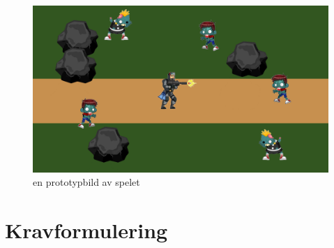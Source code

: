 \documentclass{TDP005mall}
\begin{document}
\begin{figure}[H]
  \includegraphics[width=\linewidth]{test.png}
  \caption {en prototypbild av spelet}
  \label {fig:picture}
\end {figure}


\section{Kravformulering}
\end{document}
